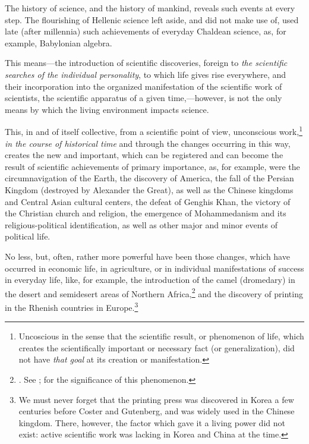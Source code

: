 The history of science, and the history of mankind, reveals such events at
every step.  The flourishing of Hellenic science left aside, and did not make
use of, used late (after millennia) such achievements of everyday Chaldean
science, as, for example, Babylonian algebra.


\Section %
This means---the introduction of scientific discoveries, foreign to \emph{the
scientific searches of the individual personality}, to which life gives rise
everywhere, and their incorporation into the organized manifestation of the
scientific work of scientists, the scientific apparatus of a given
time,---however, is not the only means by which the living environment impacts
science.

This, in and of itself collective,  from a scientific point
of view, unconscious work,\footnote{%
	Uncoscious in the sense that the scientific result, or phenomenon of
	life, which creates the scientifically important or necessary fact (or
	generalization), did not have \emph{that goal} at its creation or
	manifestation.
} \emph{in the course of historical time} and through the
changes occurring in this way, creates the new and important, which can be
registered and can become the result of scientific achievements of primary
importance, as, for example, were the circumnavigation of the Earth, the
discovery of America, the fall of the Persian Kingdom (destroyed by Alexander
the Great), as well as the Chinese kingdoms and Central Asian cultural centers,
the defeat of Genghis Khan, the victory of the Christian church and religion,
the emergence of Mohammedanism and its religious-political identification, as
well as other major and minor events of political life.

No less, but, often, rather more powerful have been those changes, which have
occurred in economic life, in agriculture, or in individual manifestations of
success in everyday life, like, for example, the introduction of the camel
(dromedary) in the desert and semidesert areas of Northern Africa,\footnote{%
	\cite[p.~178]{julien1931histoire}.  See
	\cite{gsell1926memoires}; \cite[p.~181]{gautier1927siecles} for the significance of this
	phenomenon.
} and the discovery of printing in the Rhenish countries in Europe.\footnote{%
	We must never forget that the printing press was discovered in Korea a
	few centuries before Coster and Gutenberg, and was widely used in the
	Chinese kingdom.  There, however, the factor which gave it a living
	power did not exist: active scientific work was lacking in Korea and
	China at the time.
}

